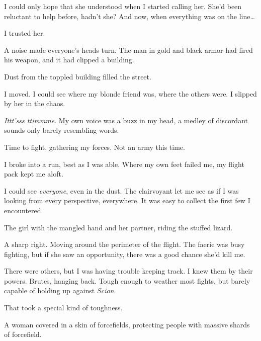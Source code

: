 I could only hope that she understood when I started calling her.  She'd been reluctant to help before, hadn't she?  And now, when everything was on the line\ldots



I trusted her.



A noise made everyone's heads turn.  The man in gold and black armor had fired his weapon, and it had clipped a building.



Dust from the toppled building filled the street.



I moved.  I could see where my blonde friend was, where the others were.  I slipped by her in the chaos.



\emph{Ittt'sss ttimmme}.  My own voice was a buzz in my head, a medley of discordant sounds only barely resembling words.



Time to fight, gathering my forces.  Not an army this time.



I broke into a run, best as I was able.  Where my own feet failed me, my flight pack kept me aloft.



I could see \emph{everyone}, even in the dust.  The clairvoyant let me see as if I was looking from every perspective, everywhere.  It was easy to collect the first few I encountered.



The girl with the mangled hand and her partner, riding the stuffed lizard.



A sharp right.  Moving around the perimeter of the flight.  The faerie was busy fighting, but if she saw an opportunity, there was a good chance she'd kill me.



There were others, but I was having trouble keeping track.  I knew them by their powers.  Brutes, hanging back.  Tough enough to weather most fights, but barely capable of holding up against \emph{Scion}.



That took a special kind of toughness.



A woman covered in a skin of forcefields, protecting people with massive shards of forcefield.



